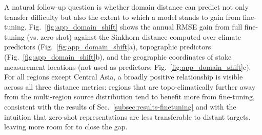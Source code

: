 \documentclass[draft]{agujournal2019}
\begin{document}
A natural follow-up question is whether domain distance can predict not only transfer difficulty but also the extent to which a model stands to gain from fine-tuning. Fig.~\ref{fig:app_domain_shift} shows the annual RMSE gain from full fine-tuning (vs. zero-shot) against the Sinkhorn distance computed over climate predictors (Fig.~\ref{fig:app_domain_shift}a), topographic predictors (Fig.~\ref{fig:app_domain_shift}b), and the geographic coordinates of stake measurement locations (not used as predictors; Fig.~\ref{fig:app_domain_shift}c). For all regions except Central Asia, a broadly positive relationship is visible across all three distance metrics: regions that are topo-climatically further away from the multi-region source distribution tend to benefit more from fine-tuning, consistent with the results of Sec.~\ref{subsec:results-finetuning} and with the intuition that zero-shot representations are less transferable to distant targets, leaving more room for  to close the gap.
\end{document}
